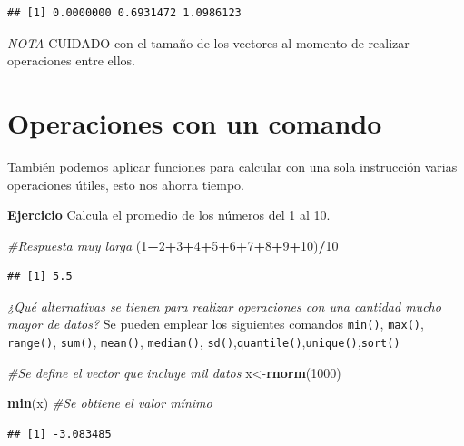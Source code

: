 \documentclass[
]{book}
\newenvironment{Shaded}{\begin{snugshade}}{\end{snugshade}}
\newcommand{\CommentTok}[1]{\textcolor[rgb]{0.56,0.35,0.01}{\textit{#1}}}
\newcommand{\DecValTok}[1]{\textcolor[rgb]{0.00,0.00,0.81}{#1}}
\newcommand{\FunctionTok}[1]{\textcolor[rgb]{0.13,0.29,0.53}{\textbf{#1}}}
\newcommand{\NormalTok}[1]{#1}
\newcommand{\OtherTok}[1]{\textcolor[rgb]{0.56,0.35,0.01}{#1}}
\newcommand{\SpecialCharTok}[1]{\textcolor[rgb]{0.81,0.36,0.00}{\textbf{#1}}}
\begin{document}
\begin{verbatim}
## [1] 0.0000000 0.6931472 1.0986123
\end{verbatim}

\emph{NOTA} CUIDADO con el tamaño de los vectores al momento de realizar operaciones entre ellos.

\section{Operaciones con un comando}\label{operaciones-con-un-comando}

También podemos aplicar funciones para calcular con una sola instrucción varias operaciones útiles, esto nos ahorra tiempo.

\textbf{Ejercicio} Calcula el promedio de los números del 1 al 10.

\begin{Shaded}
\begin{Highlighting}[]
\CommentTok{\#Respuesta muy larga }
\NormalTok{(}\DecValTok{1}\SpecialCharTok{+}\DecValTok{2}\SpecialCharTok{+}\DecValTok{3}\SpecialCharTok{+}\DecValTok{4}\SpecialCharTok{+}\DecValTok{5}\SpecialCharTok{+}\DecValTok{6}\SpecialCharTok{+}\DecValTok{7}\SpecialCharTok{+}\DecValTok{8}\SpecialCharTok{+}\DecValTok{9}\SpecialCharTok{+}\DecValTok{10}\NormalTok{)}\SpecialCharTok{/}\DecValTok{10}
\end{Highlighting}
\end{Shaded}

\begin{verbatim}
## [1] 5.5
\end{verbatim}

\emph{¿Qué alternativas se tienen para realizar operaciones con una cantidad mucho mayor de datos?} Se pueden emplear los siguientes comandos \texttt{min()}, \texttt{max()}, \texttt{range()}, \texttt{sum()}, \texttt{mean()}, \texttt{median()}, \texttt{sd()},\texttt{quantile()},\texttt{unique()},\texttt{sort()}

\begin{Shaded}
\begin{Highlighting}[]
\CommentTok{\#Se define el vector que incluye mil datos}
\NormalTok{x}\OtherTok{\textless{}{-}}\FunctionTok{rnorm}\NormalTok{(}\DecValTok{1000}\NormalTok{)}

\FunctionTok{min}\NormalTok{(x) }\CommentTok{\#Se obtiene el valor mínimo}
\end{Highlighting}
\end{Shaded}

\begin{verbatim}
## [1] -3.083485
\end{verbatim}
\end{document}
